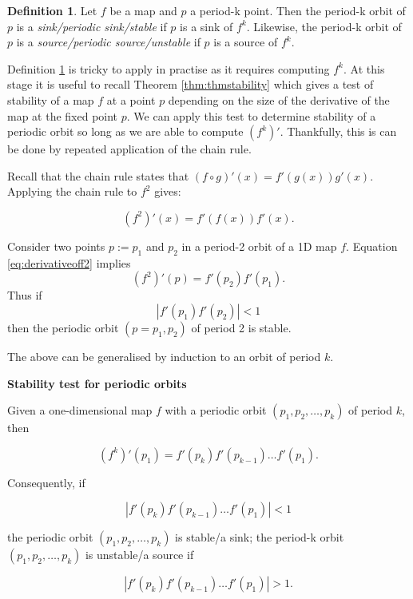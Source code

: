 \documentclass[
  a4paper,
  oneside,
  final]{krantz}
\theoremstyle{definition}
\newtheorem{definition}{Definition}[chapter]
\theoremstyle{definition}
\theoremstyle{definition}
\theoremstyle{definition}
\theoremstyle{remark}
\begin{document}
\begin{definition}
\protect\hypertarget{def:stabilityofperiodicorbits}{}\label{def:stabilityofperiodicorbits}Let \(f\) be a map and \(p\) a period-k point. Then the period-k orbit of \(p\) is a \emph{sink/periodic sink/stable} if \(p\) is a sink of \(f^{k}\). Likewise, the period-k orbit of \(p\) is a \emph{source/periodic source/unstable} if \(p\) is a source of \(f^{k}\).
\end{definition}

Definition \ref{def:stabilityofperiodicorbits} is tricky to apply in practise as it requires computing \(f^{k}\). At this stage it is useful to recall Theorem \ref{thm:thmstability} which gives a test of stability of a map \(f\) at a point \(p\) depending on the size of the derivative of the map at the fixed point \(p\). We can apply this test to determine stability of a periodic orbit so long as we are able to compute \((f^{k})'\). Thankfully, this is can be done by repeated application of the chain rule.

Recall that the chain rule states that \((f\circ g)'(x) = f'(g(x)) g'(x)\). Applying the chain rule to \(f^2\) gives:

\begin{equation}
(f^2)'(x) = f'(f(x)) f'(x). \label{eq:derivativeoff2}
\end{equation}

Consider two points \(p:=p_1\) and \(p_2\) in a period-2 orbit of a 1D map \(f\). Equation \eqref{eq:derivativeoff2} implies
\[(f^2)'(p) = f'(p_2)f'(p_1).\] Thus if \[|f'(p_1)f'(p_2)| <1\] then the periodic orbit \((p=p_1, p_2)\) of period 2 is stable.

The above can be generalised by induction to an orbit of period \(k\).

\begin{palegreenbox}

\begin{center}
\textbf{Stability test for periodic orbits}

\end{center}

Given a one-dimensional map \(f\) with a periodic orbit \((p_1, p_2, \ldots, p_k)\) of period \(k\), then

\[(f^{k})'(p_1) = f'(p_k)f'(p_{k-1}) \ldots f'(p_1).\]

Consequently, if

\[|f'(p_k)f'(p_{k-1}) \ldots f'(p_1)| <1\]

the periodic orbit \((p_1, p_2, \ldots, p_k)\) is stable/a sink; the period-k orbit \((p_1, p_2, \ldots, p_k)\) is unstable/a source if

\[ |f'(p_k)f'(p_{k-1}) \ldots f'(p_1)| >1.\]

\end{palegreenbox}
\end{document}
